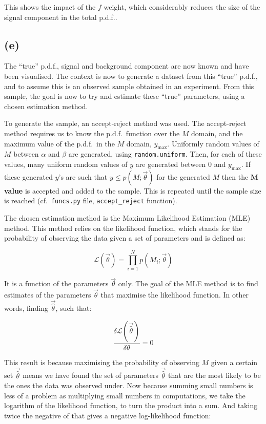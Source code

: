 \documentclass[12pt]{report} %
\begin{document}
This shows the impact of the $f$ weight, which considerably reduces the size of the signal component in the total p.d.f.. 

\subsection*{(e)}

The ``true'' p.d.f., signal and background component are now known and have been visualised. The context is now to generate a dataset from this ``true'' p.d.f., and to assume this is an observed sample obtained in an experiment. From this sample, the goal is now to try and estimate these ``true'' parameters, using a chosen estimation method.  

To generate the sample, an accept-reject method was used. The accept-reject method requires us to know the p.d.f.\ function over the $M$ domain, and the maximum value of the p.d.f.\ in the $M$ domain, $y_{\max}$. Uniformly random values of $M$ between $\alpha$ and $\beta$ are generated, using \texttt{random.uniform}. Then, for each of these values, many uniform random values of $y$ are generated between 0 and $y_{\max}$. If these generated $y$'s are such that $y \leq p(M;\vec{\theta})$ for the generated $M$ then the \textbf{$\mathbf{M}$ value} is accepted and added to the sample. This is repeated until the sample size is reached (cf.\ \texttt{funcs.py} file, \texttt{accept\_reject} function).  

The chosen estimation method is the Maximum Likelihood Estimation (MLE) method. This method relies on the likelihood function, which stands for the probability of observing the data given a set of parameters and is defined as:

\begin{equation}
    \mathcal{L}(\vec{\theta}) = \displaystyle \prod_{i=1}^{N} p(M_{i};\vec{\theta})
\end{equation}

It is a function of the parameters $\vec{\theta}$ only. The goal of the MLE method is to find estimates of the parameters $\vec{\theta}$ that maximise the likelihood function. In other words, finding $\vec{\hat{\theta}}$, such that:  

\begin{equation}
    \frac{\delta\mathcal{L}(\vec{\hat{\theta}})}{\delta \theta} = 0
\end{equation}

This result is because maximising the probability of observing $M$ given a certain set $\vec{\hat{\theta}}$ means we have found the set of parameters $\vec{\hat{\theta}}$ that are the most likely to be the ones the data was observed under. Now because summing small numbers is less of a problem as multiplying small numbers in computations, we take the logarithm of the likelihood function, to turn the product into a sum. And taking twice the negative of that gives a negative log-likelihood function:
\end{document}
